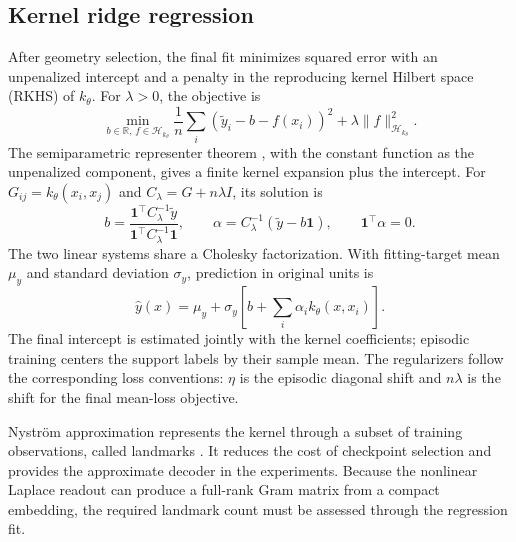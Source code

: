 \documentclass[11pt]{article}
\newcommand{\R}{\mathbb R}
\newcommand{\one}{\bm 1}
\begin{document}
\subsection{Kernel ridge regression}
After geometry selection, the final fit minimizes squared error with an unpenalized intercept and a penalty in the reproducing kernel Hilbert space (RKHS) of $k_\theta$. For $\lambda>0$, the objective is
\begin{equation}
 \min_{b\in\R,\,f\in\mathcal H_{k_\theta}}
 \frac1n\sum_i(\widetilde y_i-b-f(x_i))^2+\lambda\|f\|_{\mathcal H_{k_\theta}}^2.
\end{equation}
The semiparametric representer theorem \cite[Theorem~2]{scholkopf2001}, with the constant function as the unpenalized component, gives a finite kernel expansion plus the intercept. For $G_{ij}=k_\theta(x_i,x_j)$ and $C_\lambda=G+n\lambda I$, its solution is
\begin{equation}
 b=\frac{\one^\top C_\lambda^{-1}\widetilde y}
          {\one^\top C_\lambda^{-1}\one},\qquad
 \alpha=C_\lambda^{-1}(\widetilde y-b\one),\qquad
 \one^\top\alpha=0.
 \label{eq:ridge}
\end{equation}
The two linear systems share a Cholesky factorization. With fitting-target mean $\mu_y$ and standard deviation $\sigma_y$, prediction in original units is
\begin{equation}
 \widehat y(x)=\mu_y+\sigma_y\left[b+\sum_i\alpha_i k_\theta(x,x_i)\right].
\end{equation}
The final intercept is estimated jointly with the kernel coefficients; episodic training centers the support labels by their sample mean. The regularizers follow the corresponding loss conventions: $\eta$ is the episodic diagonal shift and $n\lambda$ is the shift for the final mean-loss objective.

Nystr\"om approximation represents the kernel through a subset of training observations, called landmarks \cite{williams2001}. It reduces the cost of checkpoint selection and provides the approximate decoder in the experiments. Because the nonlinear Laplace readout can produce a full-rank Gram matrix from a compact embedding, the required landmark count must be assessed through the regression fit.
\end{document}

